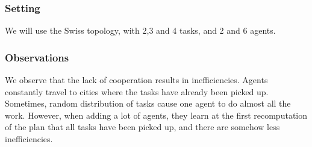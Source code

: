 \documentclass[11pt]{article}
\begin{document}
\subsubsection{Setting}
We will use the Swiss topology, with 2,3 and 4 tasks, and 2 and 6 agents.

\subsubsection{Observations}
We observe that the lack of cooperation results in inefficiencies. Agents constantly travel to cities where the tasks have already been picked up. Sometimes, random distribution of tasks cause one agent to do almost all the work. However, when adding a lot of agents, they learn at the first recomputation of the plan that all tasks have been picked up, and there are somehow less inefficiencies.
\end{document}
